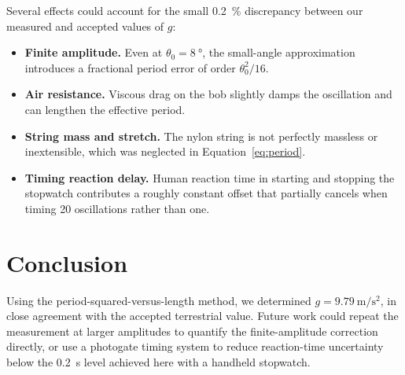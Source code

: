 \documentclass[11pt]{article}
\begin{document}
Several effects could account for the small \SI{0.2}{\percent} discrepancy between our
measured and accepted values of $g$:

\begin{itemize}
  \item \textbf{Finite amplitude.} Even at $\theta_0 = \SI{8}{\degree}$, the small-angle
    approximation introduces a fractional period error of order $\theta_0^2/16$.
  \item \textbf{Air resistance.} Viscous drag on the bob slightly damps the oscillation and
    can lengthen the effective period.
  \item \textbf{String mass and stretch.} The nylon string is not perfectly massless or
    inextensible, which was neglected in Equation~\ref{eq:period}.
  \item \textbf{Timing reaction delay.} Human reaction time in starting and stopping the
    stopwatch contributes a roughly constant offset that partially cancels when timing 20
    oscillations rather than one.
\end{itemize}

\section{Conclusion}

Using the period-squared-versus-length method, we determined $g = \SI{9.79}{\metre\per\second\squared}$,
in close agreement with the accepted terrestrial value. Future work could repeat the
measurement at larger amplitudes to quantify the finite-amplitude correction directly,
or use a photogate timing system to reduce reaction-time uncertainty below the
\SI{0.2}{\second} level achieved here with a handheld stopwatch.
\end{document}
